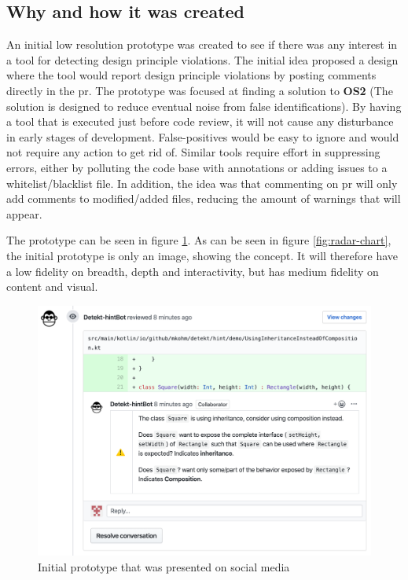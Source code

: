 \documentclass{report}
\begin{document}
\subsection*{Why and how it was created}
An initial low resolution prototype was created to see if there was any interest in a tool for detecting design principle violations. The initial idea proposed a design where the tool would report design principle violations by posting comments directly in the \gls{pr}. The prototype was focused at finding a solution to \textbf{OS2} (The solution is designed to reduce eventual noise from false identifications). By having a tool that is executed just before code review, it will not cause any disturbance in early stages of development. False-positives would be easy to ignore and would not require any action to get rid of. Similar tools require effort in suppressing errors, either by polluting the code base with annotations or adding issues to a whitelist/blacklist file. In addition, the idea was that commenting on \gls{pr} will only add comments to modified/added files, reducing the amount of warnings that will appear.  


The prototype can be seen in figure \ref{fig:mockup}. As can be seen in figure \ref{fig:radar-chart}, the initial prototype is only an image, showing the concept. It will therefore have a low fidelity on breadth, depth and interactivity, but has medium fidelity on content and visual. 


\begin{figure}[h!]
    \centering
    \includegraphics[width=\textwidth]{../images/demo.png}
    \caption{Initial prototype that was presented on social media}
    \label{fig:mockup}
\end{figure}
\end{document}
